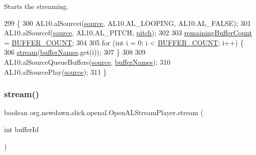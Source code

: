 Starts the streaming. 
\begin{DoxyCode}
299                                  \{
300         AL10.alSourcei(\mbox{\hyperlink{classorg_1_1newdawn_1_1slick_1_1openal_1_1_open_a_l_stream_player_abe9f7d1ac52a705aa359cf3eb1c69464}{source}}, AL10.AL\_LOOPING, AL10.AL\_FALSE);
301         AL10.alSourcef(\mbox{\hyperlink{classorg_1_1newdawn_1_1slick_1_1openal_1_1_open_a_l_stream_player_abe9f7d1ac52a705aa359cf3eb1c69464}{source}}, AL10.AL\_PITCH, \mbox{\hyperlink{classorg_1_1newdawn_1_1slick_1_1openal_1_1_open_a_l_stream_player_a3841668c39ff3eccf93978ee5ca7bc3e}{pitch}});
302 
303         \mbox{\hyperlink{classorg_1_1newdawn_1_1slick_1_1openal_1_1_open_a_l_stream_player_a071d3388ce422c839a62047c0a966315}{remainingBufferCount}} = \mbox{\hyperlink{classorg_1_1newdawn_1_1slick_1_1openal_1_1_open_a_l_stream_player_a6fabd8395e8301d9b2ea613f8b7d739c}{BUFFER\_COUNT}};
304 
305         \textcolor{keywordflow}{for} (\textcolor{keywordtype}{int} i = 0; i < \mbox{\hyperlink{classorg_1_1newdawn_1_1slick_1_1openal_1_1_open_a_l_stream_player_a6fabd8395e8301d9b2ea613f8b7d739c}{BUFFER\_COUNT}}; i++) \{
306             \mbox{\hyperlink{classorg_1_1newdawn_1_1slick_1_1openal_1_1_open_a_l_stream_player_a2facc6d1dcd937dbdc5dadcbb81929ed}{stream}}(\mbox{\hyperlink{classorg_1_1newdawn_1_1slick_1_1openal_1_1_open_a_l_stream_player_a97e8e27c6864fcc5abe85728a3e0a60b}{bufferNames}}.get(i));
307         \}
308 
309         AL10.alSourceQueueBuffers(\mbox{\hyperlink{classorg_1_1newdawn_1_1slick_1_1openal_1_1_open_a_l_stream_player_abe9f7d1ac52a705aa359cf3eb1c69464}{source}}, \mbox{\hyperlink{classorg_1_1newdawn_1_1slick_1_1openal_1_1_open_a_l_stream_player_a97e8e27c6864fcc5abe85728a3e0a60b}{bufferNames}});
310         AL10.alSourcePlay(\mbox{\hyperlink{classorg_1_1newdawn_1_1slick_1_1openal_1_1_open_a_l_stream_player_abe9f7d1ac52a705aa359cf3eb1c69464}{source}});
311     \}
\end{DoxyCode}
\mbox{\label{classorg_1_1newdawn_1_1slick_1_1openal_1_1_open_a_l_stream_player_a2facc6d1dcd937dbdc5dadcbb81929ed}} 
\subsubsection{\texorpdfstring{stream()}{stream()}}
{\footnotesize\ttfamily boolean org.\+newdawn.\+slick.\+openal.\+Open\+A\+L\+Stream\+Player.\+stream (\begin{DoxyParamCaption}\item[{int}]{buffer\+Id }\end{DoxyParamCaption})\hspace{0.3cm}{\ttfamily [inline]}}

